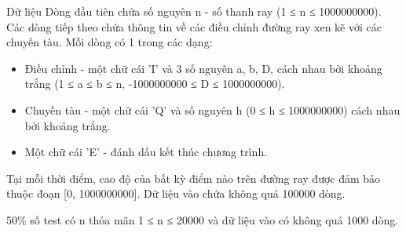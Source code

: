 Dữ liệu
Dòng đầu tiên chứa số nguyên n - số thanh ray (1 ≤ n ≤ 1000000000). Các dòng tiếp theo chứa thông tin về các điều   chỉnh đường ray xen kẽ với các chuyến tàu. Mỗi dòng có 1 trong các dạng:  
\begin{itemize}
	\item     Điều chỉnh - một chữ cái 'I' và 3 số nguyên a, b, D, cách nhau bởi khoảng trắng (1 ≤ a ≤ b ≤ n, -1000000000 ≤ D ≤   1000000000).   
	\item     Chuyến tàu - một chữ cái 'Q' và số nguyên h (0 ≤  h ≤ 1000000000) cách nhau bởi khoảng trắng.   
	\item     Một chữ cái 'E' - đánh dấu kết thúc chương trình.   
\end{itemize}

   Tại mỗi thời điểm, cao độ của bất kỳ điểm nào trên đường ray được đảm bảo thuộc đoạn [0, 1000000000]. Dữ liệu   vào chứa không quá 100000 dòng.  

   50\% số test có n thỏa mãn 1 ≤ n ≤ 20000 và dữ liệu vào có không quá 1000 dòng.